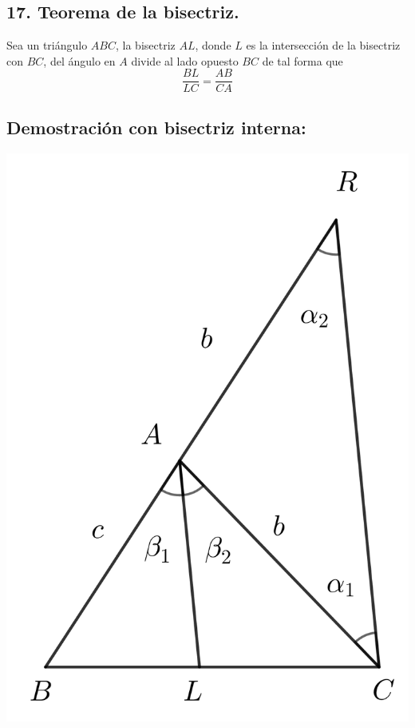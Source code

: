 \documentclass[12pt,a4paper]{article}
\begin{document}
\subsection*{17. Teorema de la bisectriz.}
Sea un triángulo $ABC$, la bisectriz $AL$, donde $L$ es la intersección de la bisectriz con $BC$, del ángulo en $A$ divide al lado opuesto $BC$ de tal forma que
$$\dfrac{BL}{LC}=\dfrac{AB}{CA}$$
\subsection*{Demostración con bisectriz interna:}
\begin{center}
\includegraphics[scale=0.6]{Imagenes/bisectriz_int.png} 
\end{center}
\end{document}
